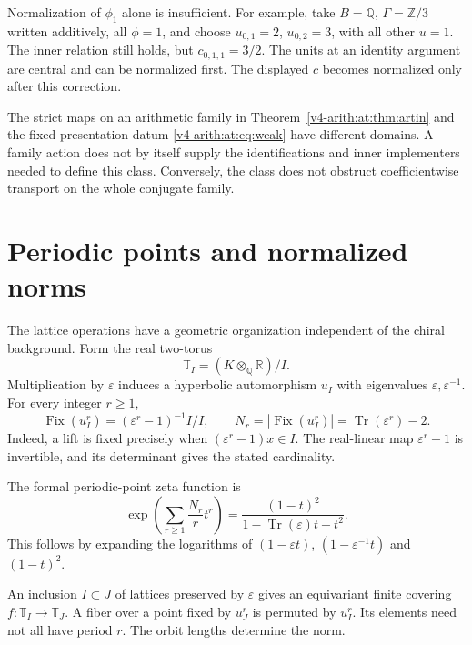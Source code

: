 Normalization of $\phi_1$ alone is insufficient. For example, take
$B=\mathbb Q$, $\Gamma=\mathbb Z/3$ written additively, all
$\phi=1$, and choose $u_{0,1}=2$, $u_{0,2}=3$, with all other
$u=1$. The inner relation still holds, but
$c_{0,1,1}=3/2$. The units at an identity argument are central and
can be normalized first. The displayed \(c\) becomes normalized
only after this correction.

The strict maps on an arithmetic family in
Theorem~\ref{v4-arith:at:thm:artin} and the fixed-presentation datum
\eqref{v4-arith:at:eq:weak} have different domains. A family action does
not by itself supply the identifications and inner implementers
needed to define this class. Conversely, the class does not
obstruct coefficientwise transport on the whole conjugate family.

\section{Periodic points and normalized norms}
\label{v4-arith:at:sec:norms}

The lattice operations have a geometric organization independent of
the chiral background. Form the real two-torus
\[
 \mathbb T_I=(K\otimes_{\mathbb Q}\mathbb R)/I.
\]
Multiplication by \(\varepsilon\) induces a hyperbolic automorphism
\(u_I\) with eigenvalues \(\varepsilon,\varepsilon^{-1}\).
For every integer \(r\geq1\),
\begin{equation}\label{v4-arith:at:eq:periodic}
 \operatorname{Fix}(u_I^r)
       =(\varepsilon^r-1)^{-1}I/I,\qquad
 N_r=|\operatorname{Fix}(u_I^r)|
       =\operatorname{Tr}(\varepsilon^r)-2.
\end{equation}
Indeed, a lift is fixed precisely when
\((\varepsilon^r-1)x\in I\). The real-linear map
\(\varepsilon^r-1\) is invertible, and its determinant gives
the stated cardinality.

The formal periodic-point zeta function is
\[
 \exp\left(\sum_{r\geq1}\frac{N_r}{r}t^r\right)
       =\frac{(1-t)^2}{1-\operatorname{Tr}(\varepsilon)t+t^2}.
\]
This follows by expanding the logarithms of
\((1-\varepsilon t)\), \((1-\varepsilon^{-1}t)\) and \((1-t)^2\).

An inclusion \(I\subset J\) of lattices preserved by
\(\varepsilon\) gives an equivariant finite covering
\(f:\mathbb T_I\to\mathbb T_J\). A fiber over a point fixed by
\(u_J^r\) is permuted by \(u_I^r\).
Its elements need not all have period \(r\).
The orbit lengths determine the norm.

